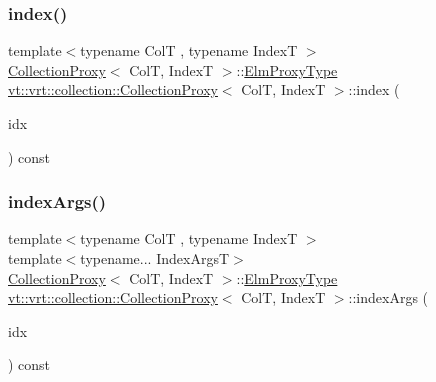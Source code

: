 \subsubsection{\texorpdfstring{index()}{index()}}
{\footnotesize\ttfamily template$<$typename ColT , typename IndexT $>$ \\
\hyperlink{structvt_1_1vrt_1_1collection_1_1_collection_proxy}{Collection\+Proxy}$<$ ColT, IndexT $>$\+::\hyperlink{structvt_1_1vrt_1_1collection_1_1_collection_proxy_a892c21eae1dca37321d7973f72b55b0a}{Elm\+Proxy\+Type} \hyperlink{structvt_1_1vrt_1_1collection_1_1_collection_proxy}{vt\+::vrt\+::collection\+::\+Collection\+Proxy}$<$ ColT, IndexT $>$\+::index (\begin{DoxyParamCaption}\item[{IndexT const \&}]{idx }\end{DoxyParamCaption}) const}

\mbox{\label{structvt_1_1vrt_1_1collection_1_1_collection_proxy_a0119b05e9284408d0b6dfc8fc47b12d6}} 
\subsubsection{\texorpdfstring{index\+Args()}{indexArgs()}}
{\footnotesize\ttfamily template$<$typename ColT , typename IndexT $>$ \\
template$<$typename... Index\+ArgsT$>$ \\
\hyperlink{structvt_1_1vrt_1_1collection_1_1_collection_proxy}{Collection\+Proxy}$<$ ColT, IndexT $>$\+::\hyperlink{structvt_1_1vrt_1_1collection_1_1_collection_proxy_a892c21eae1dca37321d7973f72b55b0a}{Elm\+Proxy\+Type} \hyperlink{structvt_1_1vrt_1_1collection_1_1_collection_proxy}{vt\+::vrt\+::collection\+::\+Collection\+Proxy}$<$ ColT, IndexT $>$\+::index\+Args (\begin{DoxyParamCaption}\item[{Index\+ArgsT \&\&...}]{idx }\end{DoxyParamCaption}) const}

\mbox{\label{structvt_1_1vrt_1_1collection_1_1_collection_proxy_a8a06bed8946060c4d1e11f665e05e64f}} 
